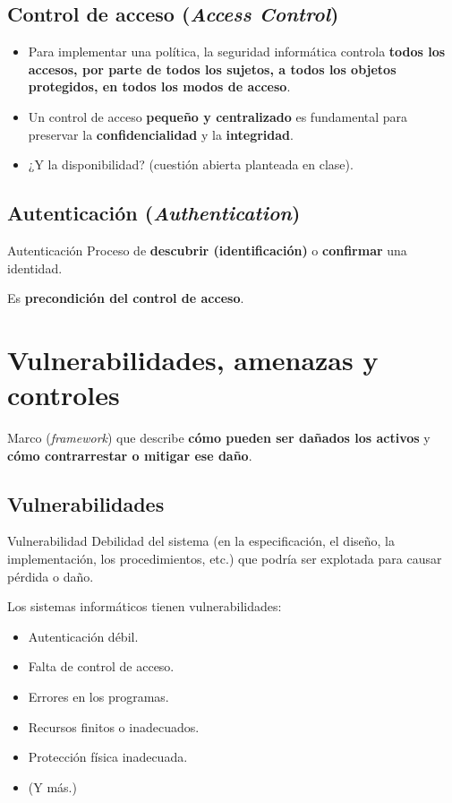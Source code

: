 \documentclass[11pt,a4paper]{report}
\begin{document}
\subsection{Control de acceso (\emph{Access Control})}

\begin{itemize}
  \item Para implementar una política, la seguridad informática controla \textbf{todos los accesos, por parte de todos los sujetos, a todos los objetos protegidos, en todos los modos de acceso}.
  \item Un control de acceso \textbf{pequeño y centralizado} es fundamental para preservar la \textbf{confidencialidad} y la \textbf{integridad}.
  \item ¿Y la disponibilidad? (cuestión abierta planteada en clase).
\end{itemize}

\subsection{Autenticación (\emph{Authentication})}

\begin{definicion}{Autenticación}
Proceso de \textbf{descubrir (identificación)} o \textbf{confirmar} una identidad.
\end{definicion}
Es \textbf{precondición del control de acceso}.

\section{Vulnerabilidades, amenazas y controles}

Marco (\emph{framework}) que describe \textbf{cómo pueden ser dañados los activos} y \textbf{cómo contrarrestar o mitigar ese daño}.

\subsection{Vulnerabilidades}

\begin{definicion}{Vulnerabilidad}
Debilidad del sistema (en la especificación, el diseño, la implementación, los procedimientos, etc.) que podría ser explotada para causar pérdida o daño.
\end{definicion}

Los sistemas informáticos tienen vulnerabilidades:
\begin{itemize}
  \item Autenticación débil.
  \item Falta de control de acceso.
  \item Errores en los programas.
  \item Recursos finitos o inadecuados.
  \item Protección física inadecuada.
  \item (Y más.)
\end{itemize}
\end{document}

